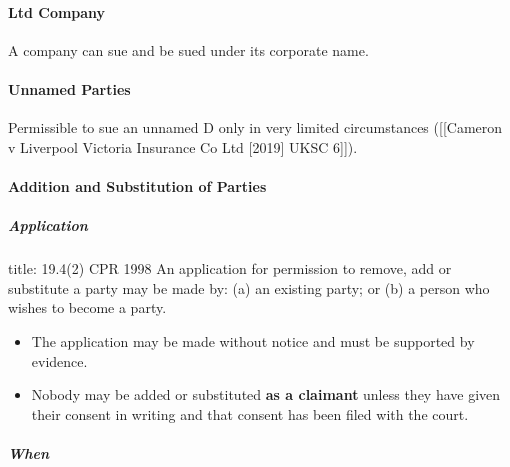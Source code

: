 \documentclass[
]{article}
\newenvironment{Shaded}{}{}
\newcommand{\NormalTok}[1]{#1}
\providecommand{\tightlist}{%
  \setlength{\itemsep}{0pt}\setlength{\parskip}{0pt}}
\begin{document}
\hypertarget{ltd-company}{%
\paragraph{Ltd Company}\label{ltd-company}}

A company can sue and be sued under its corporate name.

\hypertarget{unnamed-parties}{%
\paragraph{Unnamed Parties}\label{unnamed-parties}}

Permissible to sue an unnamed D only in very limited circumstances
({[}{[}Cameron v Liverpool Victoria Insurance Co Ltd {[}2019{]} UKSC
6{]}{]}).

\hypertarget{addition-and-substitution-of-parties}{%
\paragraph{Addition and Substitution of
Parties}\label{addition-and-substitution-of-parties}}

\hypertarget{application}{%
\subparagraph{Application}\label{application}}

\begin{Shaded}
\begin{Highlighting}[]
\NormalTok{title: 19.4(2) CPR 1998}
\NormalTok{An application for permission to remove, add or substitute a party may be made by:}
\NormalTok{(a) an existing party; or}
\NormalTok{(b) a person who wishes to become a party.}
\end{Highlighting}
\end{Shaded}

\begin{itemize}
\tightlist
\item
  The application may be made without notice and must be supported by
  evidence.
\item
  Nobody may be added or substituted \textbf{as a claimant} unless they
  have given their consent in writing and that consent has been filed
  with the court.
\end{itemize}

\hypertarget{when}{%
\subparagraph{When}\label{when}}
\end{document}
